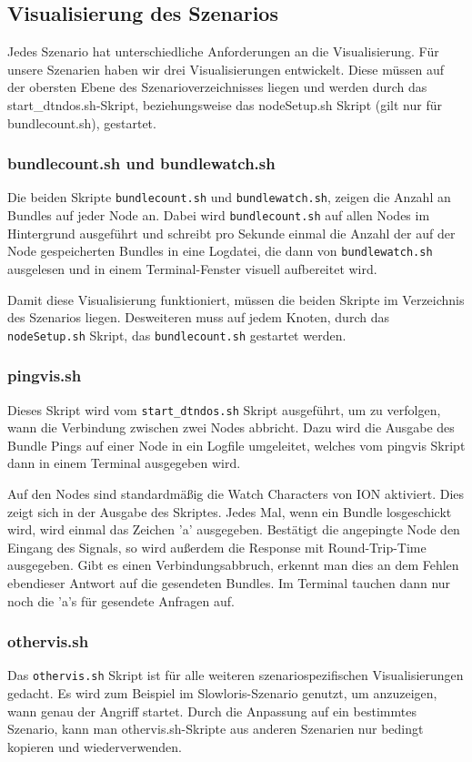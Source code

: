 \documentclass{article}
\begin{document}
\subsection{Visualisierung des Szenarios}\label{visualisierung}
Jedes Szenario hat unterschiedliche Anforderungen an die Visualisierung. Für unsere Szenarien haben wir drei Visualisierungen entwickelt. Diese  müssen auf der obersten Ebene des Szenarioverzeichnisses liegen und werden durch das start\_dtndos.sh-Skript, beziehungsweise das nodeSetup.sh Skript (gilt nur für bundlecount.sh), gestartet.

\subsubsection{bundlecount.sh und bundlewatch.sh}
Die beiden Skripte \texttt{bundlecount.sh} und \texttt{bundlewatch.sh}, zeigen die Anzahl an Bundles auf jeder Node an. Dabei wird \texttt{bundlecount.sh} auf allen Nodes im Hintergrund ausgeführt und schreibt pro Sekunde einmal die Anzahl der auf der Node gespeicherten Bundles in eine Logdatei, die dann von \texttt{bundlewatch.sh} ausgelesen und in einem Terminal-Fenster visuell aufbereitet wird.\par
Damit diese Visualisierung funktioniert, müssen die beiden Skripte im Verzeichnis des Szenarios liegen. Desweiteren muss auf jedem Knoten, durch das \texttt{nodeSetup.sh} Skript, das \texttt{bundlecount.sh} gestartet werden.

\subsubsection{pingvis.sh}
Dieses Skript wird vom \texttt{start\_dtndos.sh} Skript ausgeführt, um zu verfolgen, wann die Verbindung zwischen zwei Nodes abbricht. Dazu wird die Ausgabe des Bundle Pings auf einer Node in ein Logfile umgeleitet, welches vom pingvis Skript dann in einem Terminal ausgegeben wird.\par
Auf den Nodes sind standardmäßig die Watch Characters von ION aktiviert. Dies zeigt sich in der Ausgabe des Skriptes. Jedes Mal, wenn ein Bundle losgeschickt wird, wird einmal das Zeichen 'a' ausgegeben. Bestätigt die angepingte Node den Eingang des Signals, so wird außerdem die Response mit Round-Trip-Time ausgegeben. Gibt es einen Verbindungsabbruch, erkennt man dies an dem Fehlen ebendieser Antwort auf die gesendeten Bundles. Im Terminal tauchen dann nur noch die 'a's für gesendete Anfragen auf. 

\subsubsection{othervis.sh}
Das \texttt{othervis.sh} Skript ist für alle weiteren szenariospezifischen Visualisierungen gedacht. Es wird zum Beispiel im Slowloris-Szenario genutzt, um anzuzeigen, wann genau der Angriff startet. Durch die Anpassung auf ein bestimmtes Szenario, kann man othervis.sh-Skripte aus anderen Szenarien nur bedingt kopieren und wiederverwenden.
\end{document}
